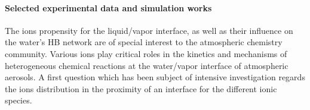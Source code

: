 
\paragraph{Selected experimental data and simulation works}

The ions propensity for the liquid/vapor interface, as well as their influence on  
the water's HB network are of special interest to the atmospheric chemistry community.%
Various ions play critical roles in the kinetics and mechanisms of heterogeneous chemical reactions 
at the water/vapor interface of atmospheric aerosols. 
A first question which has been subject of intensive investigation regards the ions distribution in the proximity of an interface for the different ionic species.

